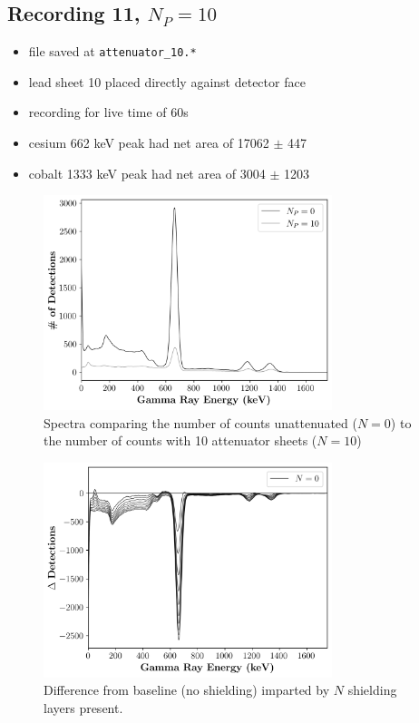 \documentclass[a4paper]{article}
\begin{document}
\subsection{Recording 11, $N_{P}=10$}
\begin{itemize}
    \item file saved at \verb|attenuator_10.*|
    \item lead sheet 10 placed directly against detector face
    \item recording for live time of 60s
    \item cesium 662 keV peak had net area of 17062 $\pm$ 447
    \item cobalt 1333 keV peak had net area of 3004 $\pm$ 1203
\end{itemize}

\begin{figure}[H]
    \centering
    \includegraphics[width=0.75\textwidth]{figures/attenuated_unattenuated_spectra_smooth.png}
    \caption{Spectra comparing the number of counts unattenuated ($N=0$) to the number of counts with 10 attenuator sheets ($N=10$)}
\end{figure}
\begin{figure}[H]
    \centering
    \includegraphics[width=0.75\textwidth]{figures/attenuator_difference_counts_smooth.png}
    \caption{Difference from baseline (no shielding) imparted by $N$ shielding layers present.}
\end{figure}
\end{document}
